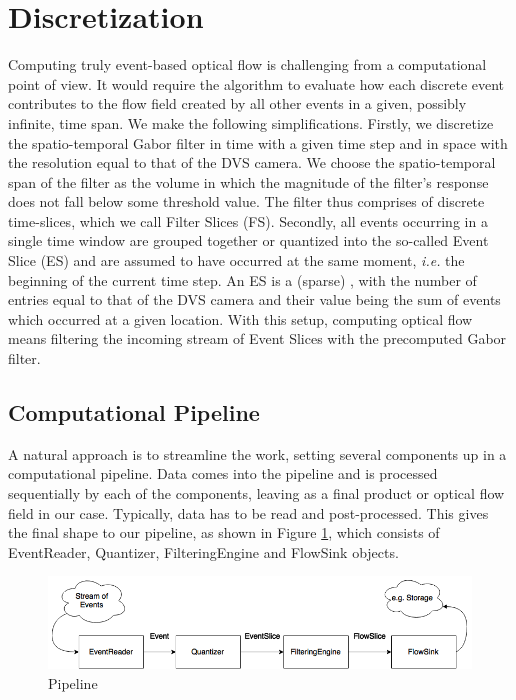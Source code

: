 \section{Discretization}

Computing truly event-based optical flow is challenging from a computational point of view. 
It would require the algorithm to evaluate how each discrete event contributes to the flow field created by all other events in a given, possibly infinite, time span.
We make the following simplifications.
Firstly, we discretize the spatio-temporal Gabor filter in time with a given time step and in space with the resolution equal to that of the DVS camera.
We choose the spatio-temporal span of the filter as the volume in which the magnitude of the filter's response does not fall below some threshold value.
The filter thus comprises of discrete time-slices, which we call Filter Slices (FS).
Secondly, all events occurring in a single time window are grouped together or quantized into the so-called Event Slice (ES) and are assumed to have occurred at the same moment, \emph{i.e.} the beginning of the current time step. 
An ES is a (sparse) , with the number of entries equal to that of the DVS camera and their value being the sum of events which occurred at a given location. 
With this setup, computing optical flow means filtering the incoming stream of Event Slices with the precomputed Gabor filter.


\subsection{Computational Pipeline}
A natural approach is to streamline the work, setting several components up in a computational pipeline.
Data comes into the pipeline and is processed sequentially by each of the components, leaving as a final product or optical flow field in our case. 
Typically, data has to be read and post-processed.
This gives the final shape to our pipeline, as shown in Figure \ref{fig:pipeline}, which consists of EventReader, Quantizer, FilteringEngine and FlowSink objects.

\begin{figure}[ht!]
 \label{fig:pipeline}
 \includegraphics[width=\textwidth]{figs/pipeline}
 \caption{Pipeline}
\end{figure}

